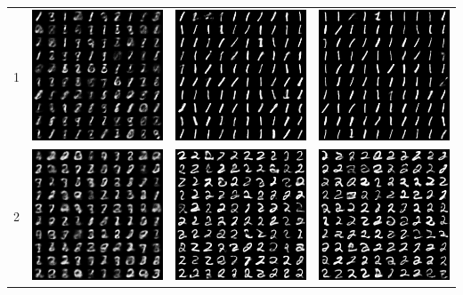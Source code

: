 \documentclass[12pt,a4paper]{article}
\begin{document}
\begin{table}
\begin{tabular}{cccc}
			1 & \includegraphics[width=4cm]{Figures/Epoch1_Label1} & \includegraphics[width=4cm]{Figures/Epoch50_Label1} & \includegraphics[width=4cm]{Figures/Epoch100_Label1}  \\
			2 & \includegraphics[width=4cm]{Figures/Epoch1_Label2} & \includegraphics[width=4cm]{Figures/Epoch50_Label2} & \includegraphics[width=4cm]{Figures/Epoch100_Label2}  \\

\end{tabular}
\end{table}
\end{document}
